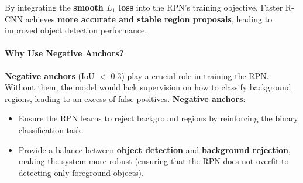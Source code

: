 By integrating the \textbf{smooth \( L_1 \) loss} into the RPN's training objective, Faster R-CNN achieves \textbf{more accurate and stable region proposals}, leading to improved object detection performance.

\paragraph{\textbf{Why Use Negative Anchors?}}
\textbf{Negative anchors} (IoU $<$ 0.3) play a crucial role in training the RPN. Without them, the model would lack supervision on how to classify background regions, leading to an excess of false positives. \textbf{Negative anchors}:
\begin{itemize}
    \item Ensure the RPN learns to reject background regions by reinforcing the binary classification task.
    \item Provide a balance between \textbf{object detection} and \textbf{background rejection}, making the system more robust (ensuring that the RPN does not overfit to detecting only foreground objects). 
\end{itemize}

